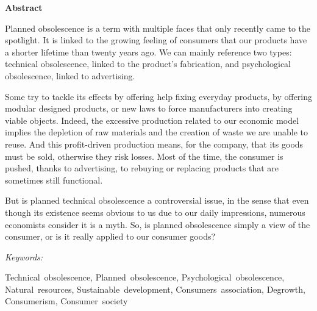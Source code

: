 


\begin{thmbox}[L]{\begin{Large}\textbf{Abstract}\end{Large}}
\vspace{0.25\baselineskip}
Planned obsolescence is a term with multiple faces that only recently came to the spotlight. It is linked to the growing feeling of consumers that our products have a shorter lifetime than twenty years ago. We can mainly reference two types: technical obsolescence, linked to the product’s fabrication, and psychological obsolescence, linked to advertising.

Some try to tackle its effects by offering help fixing everyday products, by offering modular designed products, or new laws to force manufacturers into creating viable objects. Indeed, the excessive production related to our economic model implies the depletion of raw materials and the creation of waste we are unable to reuse. And this profit-driven production means, for the company, that its goods must be sold, otherwise they risk losses. Most of the time, the consumer is pushed, thanks to advertising, to rebuying or replacing products that are sometimes still functional.

But is planned technical obsolescence a controversial issue, in the sense that even though its existence seems obvious to us due to our daily impressions, numerous economists consider it is a myth. So, is planned obsolescence simply a view of the consumer, or is it really applied to our consumer goods?
\end{thmbox}
\vspace{0.5\baselineskip}

\begin{large}\emph{Keywords:} \end{large}
 Technical~obsolescence, Planned~obsolescence, Psychological~obsolescence, \\Natural~resources, Sustainable~development, Consumers~association, Degrowth, Consumerism, Consumer~society

